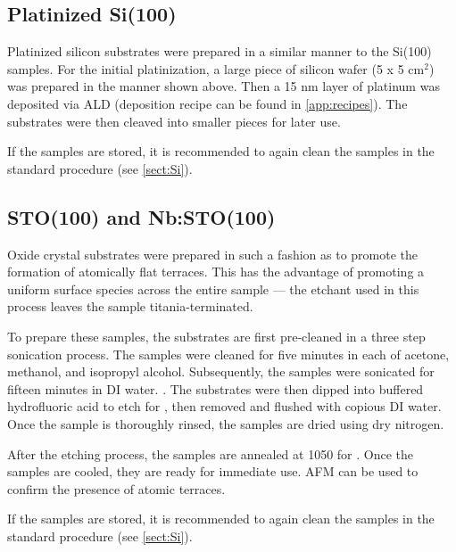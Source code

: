 
\subsection{Platinized Si(100)}

Platinized silicon substrates were prepared in a similar manner to the Si(100) samples. For the initial platinization, a large piece of silicon wafer (5 x 5 cm$^{2}$) was prepared in the manner shown above. Then a 15 nm layer of platinum was deposited via ALD (deposition recipe can be found in \ref{app:recipes}). The substrates were then cleaved into smaller pieces for later use. 

If the samples are stored, it is recommended to again clean the samples in the standard procedure (see \ref{sect:Si}).


\subsection{STO(100) and Nb:STO(100)}

Oxide crystal substrates were prepared in such a fashion as to promote the formation of atomically flat terraces. This has the advantage of promoting a uniform surface species across the entire sample --- the etchant used in this process leaves the sample titania-terminated. 

To prepare these samples, the substrates are first pre-cleaned in a three step sonication process. The samples were cleaned for five minutes in each of acetone, methanol, and isopropyl alcohol. Subsequently, the samples were sonicated for fifteen minutes in DI water. . The substrates were then dipped into buffered hydrofluoric acid to etch for , then removed and flushed with copious DI water.  Once the sample is thoroughly rinsed, the samples are dried using dry nitrogen. 

After the etching process, the samples are annealed at 1050\degC{} for . Once the samples are cooled, they are ready for immediate use. AFM can be used to confirm the presence of atomic terraces. 

If the samples are stored, it is recommended to again clean the samples in the standard procedure (see \ref{sect:Si}).


